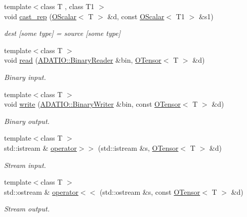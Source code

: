 \begin{DoxyCompactItemize}
{\footnotesize template$<$class T , class T1 $>$ }\\void \mbox{\hyperlink{group__obsscalar_gaa5f9d1572097c605caade566731fe99a}{cast\+\_\+rep}} (\mbox{\hyperlink{classENSEM_1_1OScalar}{O\+Scalar}}$<$ T $>$ \&d, const \mbox{\hyperlink{classENSEM_1_1OScalar}{O\+Scalar}}$<$ T1 $>$ \&s1)
\begin{DoxyCompactList}\small\item\em dest \mbox{[}some type\mbox{]} = source \mbox{[}some type\mbox{]} \end{DoxyCompactList}\item 
{\footnotesize template$<$class T $>$ }\\void \mbox{\hyperlink{group__obstensor_ga99e7dbdd85834a965f5483165945d05a}{read}} (\mbox{\hyperlink{classADATIO_1_1BinaryReader}{A\+D\+A\+T\+I\+O\+::\+Binary\+Reader}} \&bin, \mbox{\hyperlink{classENSEM_1_1OTensor}{O\+Tensor}}$<$ T $>$ \&d)
\begin{DoxyCompactList}\small\item\em Binary input. \end{DoxyCompactList}\item 
{\footnotesize template$<$class T $>$ }\\void \mbox{\hyperlink{group__obstensor_gaef90d8549fa5fa0469beb39b348ca8fd}{write}} (\mbox{\hyperlink{classADATIO_1_1BinaryWriter}{A\+D\+A\+T\+I\+O\+::\+Binary\+Writer}} \&bin, const \mbox{\hyperlink{classENSEM_1_1OTensor}{O\+Tensor}}$<$ T $>$ \&d)
\begin{DoxyCompactList}\small\item\em Binary output. \end{DoxyCompactList}\item 
{\footnotesize template$<$class T $>$ }\\std\+::istream \& \mbox{\hyperlink{group__obstensor_ga6a7ad5b01079729a5dee60bd7e98e6e1}{operator$>$$>$}} (std\+::istream \&s, \mbox{\hyperlink{classENSEM_1_1OTensor}{O\+Tensor}}$<$ T $>$ \&d)
\begin{DoxyCompactList}\small\item\em Stream input. \end{DoxyCompactList}\item 
{\footnotesize template$<$class T $>$ }\\std\+::ostream \& \mbox{\hyperlink{group__obstensor_gad4f1a718046854030a9c11c1a6d21712}{operator$<$$<$}} (std\+::ostream \&s, const \mbox{\hyperlink{classENSEM_1_1OTensor}{O\+Tensor}}$<$ T $>$ \&d)
\begin{DoxyCompactList}\small\item\em Stream output. \end{DoxyCompactList}\item 

\end{DoxyCompactItemize}

